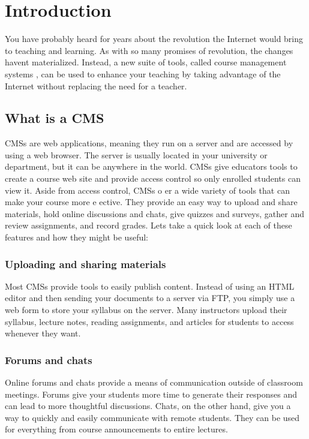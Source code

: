 \documentclass[12pt,a4paper,final,oneside]{report}
\begin{document}
\chapter{Introduction}
You have probably heard for years about the revolution the Internet would bring to teaching and learning. As with so many promises of revolution, the changes havent materialized. Instead, a new suite of tools, called course management systems , can be used to enhance your teaching by taking advantage of the Internet without replacing the need for a teacher.

\section{What is a CMS}
CMSs are web applications, meaning they run on a server and are accessed by using a web browser. The server is usually located in your university or department, but it can be anywhere in the world. CMSs give educators tools to create a course web site and provide access control so only enrolled students can view it. Aside from access control, CMSs o er a wide variety of tools that can make your course more e ective. They provide an easy way to upload and share materials, hold online discussions and chats, give quizzes and surveys, gather and review assignments, and record grades. Lets take a quick look at each of these features and how they might be useful:

\subsection{Uploading and sharing materials}
Most CMSs provide tools to easily publish content. Instead of using an HTML editor and then sending your documents to a server via FTP, you simply use a web form to store your syllabus on the server. Many instructors upload their syllabus, lecture notes, reading assignments, and articles for students to access whenever they want. 


\subsection{Forums and chats}
Online forums and chats provide a means of communication outside of classroom meetings. Forums give your students more time to generate their responses and can lead to more thoughtful discussions. Chats, on the other hand, give you a way to quickly and easily communicate with remote students. They can be used for everything from course announcements to entire lectures.
\end{document}
